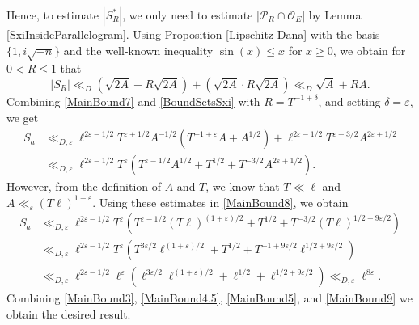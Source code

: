 \documentclass[11pt]{amsart}
\newcommand{\bigo}{\mathcal{O}}
\theoremstyle{definition}
\theoremstyle{remark}
\begin{document}
Hence, to estimate $|S_{R}^{*}|$, we only need to estimate $|\mathcal{P}_{R} \cap \bigo_{E}|$ by Lemma \ref{SxiInsideParallelogram}. Using Proposition \ref{Lipschitz-Dana} with the basis $\{1,i\sqrt{-n}\}$ and the well-known inequality $\sin(x)\leq x$ for $x\geq 0$, we obtain for $0< R\leq 1$ that
\begin{equation}
    |S_{R}| \ll_{D} \left(\sqrt{2A} + R\sqrt{2A}\right) + \left(\sqrt{2A} \cdot R\sqrt{2A}\right) \ll_{D} \sqrt{A} + RA. \label{BoundSetsSxi}
\end{equation}
Combining \eqref{MainBound7} and \eqref{BoundSetsSxi} with $R=T^{-1+\delta}$, and setting $\delta = \varepsilon$, we get
\begin{align}
    S_a &\ll_{D,\varepsilon} \ell^{2\varepsilon-1/2} T^{\varepsilon + 1/2} A^{-1/2} \left( T^{-1+\varepsilon} A + A^{1/2} \right) + \ell^{2\varepsilon -1/2} T^{\varepsilon - 3/2} A^{2\varepsilon + 1/2} \label{MainBound8} \\
    &\ll_{D,\varepsilon} \ell^{2\varepsilon - 1/2} T^{\varepsilon} \left( T^{\varepsilon - 1/2} A^{1/2} + T^{1/2} + T^{-3/2} A^{2\varepsilon + 1/2} \right). \nonumber
\end{align}
However, from the definition of $A$ and $T$, we know that $T\ll \ell$ and $A \ll_{\varepsilon} (T\ell)^{1+\varepsilon}$. Using these estimates in \eqref{MainBound8}, we obtain
\begin{align}
    S_a &\ll_{D,\varepsilon} \ell^{2\varepsilon - 1/2} T^{\varepsilon} \left( T^{\varepsilon - 1/2} (T\ell)^{(1+\varepsilon)/2} + T^{1/2} + T^{-3/2} (T\ell)^{1/2 + 9\varepsilon/2} \right) \label{MainBound9} \\
    &\ll_{D,\varepsilon} \ell^{2\varepsilon - 1/2} T^{\varepsilon} \left( T^{3\varepsilon/2} \ell^{(1+\varepsilon)/2} + T^{1/2} + T^{-1+9\varepsilon/2} \ell^{1/2 + 9\varepsilon/2} \right) \nonumber \\
    &\ll_{D,\varepsilon} \ell^{2\varepsilon - 1/2} \ell^{\varepsilon} \left( \ell^{3\varepsilon/2} \ell^{(1+\varepsilon)/2} + \ell^{1/2} + \ell^{1/2 + 9\varepsilon/2} \right) \ll_{D,\varepsilon} \ell^{8\varepsilon}. \nonumber
\end{align}
Combining \eqref{MainBound3}, \eqref{MainBound4.5}, \eqref{MainBound5}, and \eqref{MainBound9} we obtain the desired result.











\end{document}
